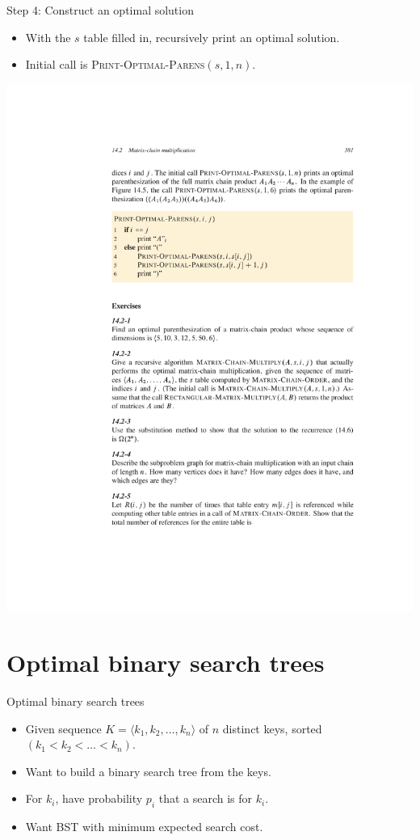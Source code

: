 \documentclass{beamer}
\begin{document}
\begin{frame}{Step 4: Construct an optimal solution}
    \begin{itemize}
        \item With the $s$ table filled in, recursively print an optimal solution.
        \item Initial call is \textsc{Print-Optimal-Parens}$(s, 1, n)$.
    \end{itemize}
    \centering
    \includegraphics[width=\textwidth, trim={4cm 17cm 3cm 6.75cm}, clip]{figures/p381}
\end{frame}

\section{Optimal binary search trees}

\begin{frame}{Optimal binary search trees}
    \begin{itemize}
        \item Given sequence $K = \langle k_1, k_2, \ldots, k_n \rangle$ of $n$ distinct keys, sorted $(k_1 < k_2 < \ldots < k_n)$.
        \item Want to build a binary search tree from the keys.
        \item For $k_i$, have probability $p_i$ that a search is for $k_i$.
        \item Want BST with minimum expected search cost.
    \end{itemize}
\end{frame}
\end{document}
